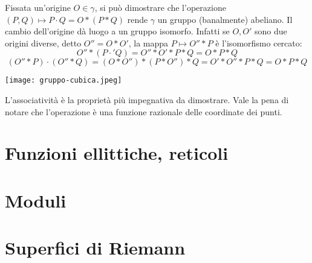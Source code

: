 Fissata un'origine $O \in \gamma$, si può dimostrare che l'operazione $(P,Q) \mapsto P \cdot Q = O*(P*Q)$ rende $\gamma$ un gruppo (banalmente) abeliano. Il cambio dell'origine dà luogo a un gruppo isomorfo. Infatti se $O,O'$ sono due origini diverse, detto $O'' = O*O'$, la mappa $P \mapsto O'' * P$ è l'isomorfismo cercato:
$$ O'' * (P \cdot' Q) = O'' * O'*P*Q = O*P*Q $$
$$ (O''*P) \cdot (O''*Q) = (O*O'')*(P*O'')*Q = O'*O''*P*Q=O*P*Q$$

\texttt{[image: gruppo-cubica.jpeg]}

L'associatività è la proprietà più impegnativa da dimostrare. Vale la pena di notare che l'operazione è una funzione razionale delle coordinate dei punti. 
\section{Funzioni ellittiche, reticoli}

\section{Moduli}

\section{Superfici di Riemann}

